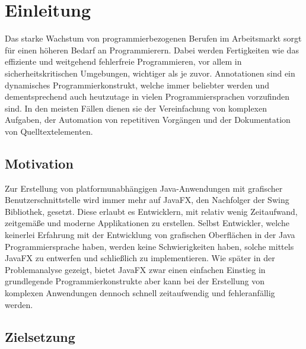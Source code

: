 \chapter{Einleitung}
\label{einleitung}
Das starke Wachstum von programmierbezogenen Berufen im Arbeitsmarkt sorgt für einen höheren Bedarf an Programmierern. Dabei werden Fertigkeiten wie das effiziente und weitgehend fehlerfreie Programmieren, vor allem in sicherheitskritischen Umgebungen, wichtiger als je zuvor. Annotationen sind ein dynamisches Programmierkonstrukt, welche immer beliebter werden und dementsprechend auch heutzutage in vielen Programmiersprachen vorzufinden sind. In den meisten Fällen dienen sie der Vereinfachung von komplexen Aufgaben, der Automation von repetitiven Vorgängen und der Dokumentation von Quelltextelementen.

\section{Motivation}
\label{motivation}
Zur Erstellung von platformunabhängigen Java-Anwendungen mit grafischer Benutzerschnittstelle wird immer mehr auf JavaFX, den Nachfolger der Swing Bibliothek, gesetzt. Diese erlaubt es Entwicklern, mit relativ wenig Zeitaufwand, zeitgemäße und moderne Applikationen zu erstellen. Selbst Entwickler, welche keinerlei Erfahrung mit der Entwicklung von grafischen Oberflächen in der Java Programmiersprache haben, werden keine Schwierigkeiten haben, solche mittels JavaFX zu entwerfen und schließlich zu implementieren. Wie später in der Problemanalyse gezeigt, bietet JavaFX zwar einen einfachen Einstieg in grundlegende Programmierkonstrukte aber
kann bei der Erstellung von komplexen Anwendungen dennoch schnell zeitaufwendig und fehleranfällig werden.
\section{Zielsetzung}
\label{zielsetzung}

\newpage
